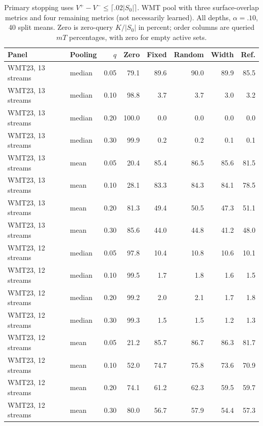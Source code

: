 \begin{table}[t]
\centering\small
\begin{tabular}{llrrrrrr}
\toprule
Panel & Pooling & $q$ & Zero & Fixed & Random & Width & Ref. \\
\midrule
WMT23, 13 streams & median & 0.05 & 79.1 & 89.6 & 90.0 & 89.9 & 85.5 \\
WMT23, 13 streams & median & 0.10 & 98.8 & 3.7 & 3.7 & 3.0 & 3.2 \\
WMT23, 13 streams & median & 0.20 & 100.0 & 0.0 & 0.0 & 0.0 & 0.0 \\
WMT23, 13 streams & median & 0.30 & 99.9 & 0.2 & 0.2 & 0.1 & 0.1 \\
WMT23, 13 streams & mean & 0.05 & 20.4 & 85.4 & 86.5 & 85.6 & 81.5 \\
WMT23, 13 streams & mean & 0.10 & 28.1 & 83.3 & 84.3 & 84.1 & 78.5 \\
WMT23, 13 streams & mean & 0.20 & 81.3 & 49.4 & 50.5 & 47.3 & 51.1 \\
WMT23, 13 streams & mean & 0.30 & 85.6 & 44.0 & 44.8 & 41.2 & 48.0 \\
WMT23, 12 streams & median & 0.05 & 97.8 & 10.4 & 10.8 & 10.6 & 10.1 \\
WMT23, 12 streams & median & 0.10 & 99.5 & 1.7 & 1.8 & 1.6 & 1.5 \\
WMT23, 12 streams & median & 0.20 & 99.2 & 2.0 & 2.1 & 1.7 & 1.8 \\
WMT23, 12 streams & median & 0.30 & 99.3 & 1.5 & 1.5 & 1.2 & 1.3 \\
WMT23, 12 streams & mean & 0.05 & 21.2 & 85.7 & 86.7 & 86.3 & 81.7 \\
WMT23, 12 streams & mean & 0.10 & 52.0 & 74.7 & 75.8 & 73.6 & 70.9 \\
WMT23, 12 streams & mean & 0.20 & 74.1 & 61.2 & 62.3 & 59.5 & 59.7 \\
WMT23, 12 streams & mean & 0.30 & 80.0 & 56.7 & 57.9 & 54.4 & 57.3 \\
\bottomrule
\end{tabular}
\caption{Primary stopping uses $V^+-V^-\le\lceil.02|S_0|\rceil$. WMT pool with three surface-overlap metrics and four remaining metrics (not necessarily learned). All depths, $\alpha=.10$, 40 split means. Zero is zero-query $K/|S_0|$ in percent; order columns are queried $mT$ percentages, with zero for empty active sets.}
\label{tab:review-balanced}
\end{table}
